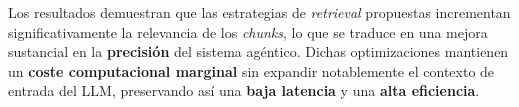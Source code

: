 \documentclass[portrait,paperwidth=84.1cm,paperheight=118.9cm]{baposter}
\begin{document}
\begin{poster}
{
Los resultados demuestran que las estrategias de \textit{retrieval} propuestas incrementan significativamente la relevancia de los \textit{chunks}, lo que se traduce en una mejora sustancial en la \textbf{precisión} del sistema agéntico. Dichas optimizaciones mantienen un \textbf{coste computacional marginal} sin expandir notablemente el contexto de entrada del LLM, preservando así una \textbf{baja latencia} y una \textbf{alta eficiencia}.

}

\end{poster}
\end{document}
